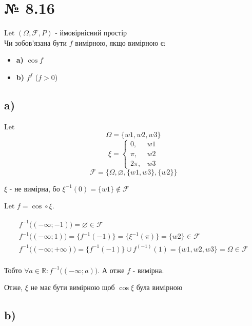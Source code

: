 \documentclass[11pt, a4paper]{article} %
\begin{document}
\section*{№ 8.16}
\begin{mdframed}
    Let $(\Omega, \mathcal F, P)$ - ймовірнісний простір\\
    Чи зобов'язана бути $f$ вимірною, якщо вимірною є:
    \begin{itemize}
        \item \textbf{a)} $\cos f$ 
        \item \textbf{b)} $f^f$ ($f>0$)
    \end{itemize}
\end{mdframed}

\subsection*{a)}

Let 
$$
\Omega = \{w1, w2, w3\}$$
$$
\xi = \begin{cases}
    0,& w1\\
    \pi,& w2\\
    2\pi,& w3    
\end{cases}
$$
$$
\mathcal F = \{\Omega, \varnothing, \{w1,w3\}, \{w2\}\}
$$

$\xi$ - не вимірна, бо $\xi^{-1} (0) = \{w1\} \notin \mathcal F$

Let $f = \cos \circ \xi$. 

$$
\begin{gathered}
    f^{-1}\bigl((-\infty; -1)\bigr) = \varnothing \in \mathcal F\\
    f^{-1}\bigl((-\infty; 1)\bigr) = \{f^{-1}(-1)\} = \{\xi^{-1}(\pi)\} = \{w2\} \in \mathcal F\\
    f^{-1}\bigl((-\infty; +\infty)\bigr) = \{f^{-1}(-1)\} \cup f^(-1)(1) = \{ w1, w2, w3 \} = \Omega \in \mathcal F\\
\end{gathered}
$$

Тобто $\forall a \in \mathbb R : f^{-1}\bigl((-\infty;a)\bigr)$. А отже $f$ - вимірна.

\begin{mdframed}[style=ans]
    Отже, $\xi$ не має бути вимірною щоб $\cos \xi$ була вимірною
\end{mdframed}

\subsection*{b)}
\end{document}
